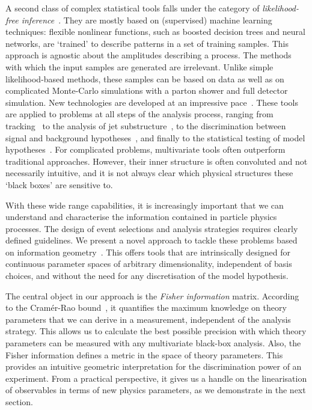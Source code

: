 A second class of complex statistical tools falls under the category of
\emph{likelihood-free inference}~\cite{cranmer:nips2016}. They are
mostly based on (supervised) machine learning techniques:
flexible nonlinear functions, such as boosted decision trees and
neural networks, are `trained' to describe patterns in a set of
training samples. This approach is agnostic about the amplitudes
describing a process. The methods with which the input samples are
generated are irrelevant. Unlike simple likelihood-based methods,
these samples can be based on data as well as on complicated
Monte-Carlo simulations with a parton shower and full detector
simulation. New technologies are developed at an impressive
pace~\cite{Cranmer:2015bka, Louppe:2016ylz, Louppe:2016aov,
  Cranmer:2016lzt, Baldi:2016fzo}. These tools are applied to problems
at all steps of the analysis process, ranging from
tracking~\cite{Brehmer:ghost_probability, Aad:2014yva} to the analysis of jet
substructure~\cite{Cogan:2014oua, Baldi:2014pta, deOliveira:2015xxd,
  Almeida:2015jua, Baldi:2016fql, Guest:2016iqz, Komiske:2016rsd,
  Kasieczka:2017nvn, Louppe:2017ipp}, to the discrimination between
signal and background hypotheses~\cite{Baldi:2014kfa, Searcy:2015apa,
  Santos:2016kno, Alves:2016htj}, and finally to the statistical
testing of model hypotheses~\cite{Buckley:2011kc, Bornhauser:2013aya,
  Bechtle:2017vyu}. For complicated problems, multivariate tools often
outperform traditional approaches. However, their inner structure is
often convoluted and not necessarily intuitive, and it is not
always clear which physical structures these `black boxes' are
sensitive to.

\newparagraph
%
With these wide range capabilities, it is increasingly important that
we can understand and characterise the information contained in
particle physics processes. The design of event selections and
analysis strategies requires clearly defined guidelines. We present a
novel approach to tackle these problems based on information
geometry~\cite{efron1975, amari1982, amari2000joho}. This offers tools
that are intrinsically designed for continuous parameter spaces of
arbitrary dimensionality, independent of basis choices, and without
the need for any discretisation of the model hypothesis.

The central object in our approach is the \emph{Fisher information}
matrix. According to the Cram\'er-Rao bound~\cite{Rao:1945,
  Cramer:1946}, it quantifies the maximum knowledge on
theory parameters that we can derive in a measurement, independent of
the analysis strategy. This allows us to calculate the best possible
precision with which theory parameters can be measured with any
multivariate black-box analysis. Also, the Fisher information defines
a metric in the space of theory parameters. This provides an intuitive
geometric interpretation for the discrimination power of an
experiment. From a practical perspective, it gives us a handle on the
linearisation of observables in terms of new physics parameters, as we
demonstrate in the next section.

